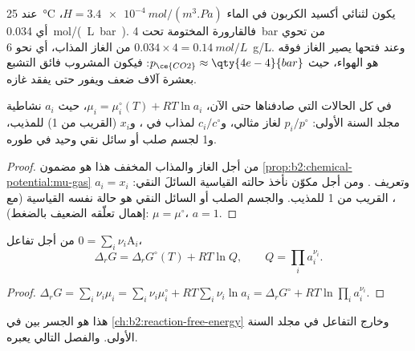 \begin{example}\label{ex:b2:chemical-potential:soda}
عند \qty{25}{\celsius} يكون  لثنائي أكسيد الكربون في الماء $H =
\qty{3.4e-4}{mol/(m^3.Pa)}$، أي \qty{0.034}{mol/(L.bar)}. فالقارورة
المختومة تحت \qty{4}{bar} من  تحوي $0.034 \times 4 =
\qty{0.14}{mol/L}$ من الغاز المذاب، أي نحو \qty{6}{g/L}. وعند فتحها يصير
الغاز فوقه هو الهواء، حيث $p_{\ce{CO2}} \approx \qty{4e-4}{bar}$: فيكون
المشروب فائق التشبع بعشرة آلاف ضعف ويفور حتى يفقد غازه.
\end{example}

\begin{proposition}\label{prop:b2:chemical-potential:activity}
في كل الحالات التي صادفناها حتى الآن، $\mu_i = \mu_i^\circ(T) + RT\ln a_i$،
حيث $a_i$ نشاطية مجلد السنة الأولى: $p_i/p^\circ$ لغاز مثالي، 
و$c_i/c^\circ$ لمذاب في ، و$x_i$ (القريب من 1)
للمذيب، و1 لجسم صلب أو سائل نقي وحيد في طوره.
\end{proposition}

\begin{proof}
من أجل الغاز والمذاب المخفف هذا هو مضمون
\cref{prop:b2:chemical-potential:mu-gas} وتعريف . ومن أجل مكوّن  نأخذ حالته القياسية السائلَ النقي:
$a_i = x_i$، القريب من 1 للمذيب. والجسم الصلب أو السائل النقي هو حالة
نفسه القياسية (مع إهمال تعلّقه الضعيف بالضغط): $\mu = \mu^\circ$، $a = 1$.
\end{proof}

\begin{proposition}\label{prop:b2:chemical-potential:delta-g-q}
من أجل تفاعل $0 = \sum_i\nu_i\mathrm A_i$،
\[
  \Delta_r G = \Delta_r G^\circ(T) + RT\ln Q, \qquad Q = \prod_i a_i^{\nu_i} .
\]
\end{proposition}

\begin{proof}
$\Delta_r G = \sum_i\nu_i\mu_i = \sum_i\nu_i\mu_i^\circ + RT\sum_i\nu_i\ln a_i =
\Delta_r G^\circ + RT\ln\prod_i a_i^{\nu_i}$.
\end{proof}

هذا هو الجسر بين  في \cref{ch:b2:reaction-free-energy}
وخارج التفاعل في مجلد السنة الأولى. والفصل التالي يعبره.

